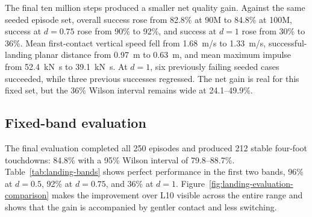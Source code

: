 The final ten million steps produced a smaller net quality gain. Against the same
seeded episode set, overall success rose from 82.8\% at 90M to 84.8\% at 100M, success at
$d=0.75$ rose from 90\% to 92\%, and success at $d=1$ rose from 30\% to 36\%. Mean first-contact
vertical speed fell from \SI{1.68}{m/s} to \SI{1.33}{m/s}, successful-landing planar distance
from \SI{0.97}{m} to \SI{0.63}{m}, and mean maximum impulse from
\SI{52.4}{\kilo\newton\second} to \SI{39.1}{\kilo\newton\second}. At $d=1$, six previously
failing seeded cases succeeded, while three previous
successes regressed. The net gain is real for this fixed set, but the 36\% Wilson interval remains
wide at 24.1--49.9\%.

\subsection{Fixed-band evaluation}

The final evaluation completed all 250 episodes and produced 212 stable four-foot touchdowns:
84.8\% with a 95\% Wilson interval of 79.8--88.7\%. Table~\ref{tab:landing-bands} shows perfect
performance in the first two bands, 96\% at $d=0.5$, 92\% at $d=0.75$, and 36\% at $d=1$.
Figure~\ref{fig:landing-evaluation-comparison} makes the improvement over L10 visible across the
entire range and shows that the gain is accompanied by gentler contact and less switching.

\begin{table}[htbp]
  \centering
  \caption{L11 landing evaluation by fixed curriculum band. Each band contains 50 episodes;
  intervals are 95\% Wilson intervals.}
  \label{tab:landing-bands}
\end{table}

